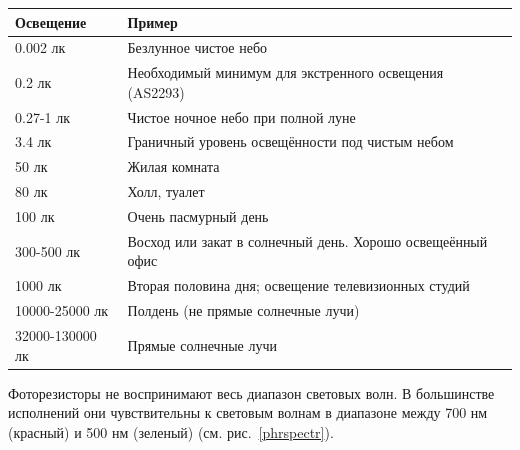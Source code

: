 \documentclass[12pt]{article}
\begin{document}
\begin{table}[H]
    \caption{Уровни освещенности, воспринимаемые человеком}\label{illtable}
    \begin{longtable}[]{@{}l|l@{}}
        \toprule
        Освещение       & Пример                                                 \\
        \midrule
        \endhead
        0.002 лк        & Безлунное чистое небо                                  \\
        0.2 лк          & Необходимый минимум для экстренного освещения (AS2293) \\
        0.27-1 лк       & Чистое ночное небо при полной луне                     \\
        3.4 лк          & Граничный уровень освещённости под чистым небом        \\
        50 лк           & Жилая комната                                          \\
        80 лк           & Холл, туалет                                           \\
        100 лк          & Очень пасмурный день                                   \\
        300-500 лк      & Восход или закат в солнечный день. Хорошо освещеённый
        офис                                                                     \\
        1000 лк         & Вторая половина дня; освещение телевизионных студий    \\
        10000-25000 лк  & Полдень (не прямые солнечные лучи)                     \\
        32000-130000 лк & Прямые солнечные лучи                                  \\
        \bottomrule
    \end{longtable}
\end{table}

Фоторезисторы не воспринимают весь диапазон световых волн. В большинстве исполнений они чувствительны к световым волнам в диапазоне между 700 нм (красный) и 500 нм (зеленый) (см. рис.~\ref{phrspectr}).
\end{document}

